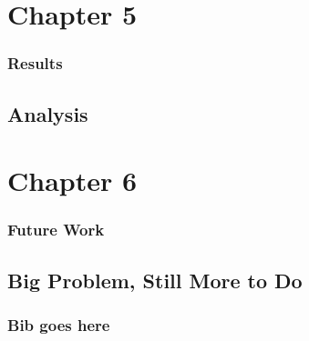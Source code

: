 \documentclass{article}
\begin{document}
\newpage

\setcounter{section}{5}
\setcounter{subsection}{0}
\section*{Chapter 5}

\subsubsection*{Results}

\subsection{Analysis}

\newpage

\setcounter{section}{6}
\setcounter{subsection}{0}
\section*{Chapter 6}

\subsubsection*{Future Work}

\subsection{Big Problem, Still More to Do}


\newpage

\subsubsection*{Bib goes here}
\end{document}
